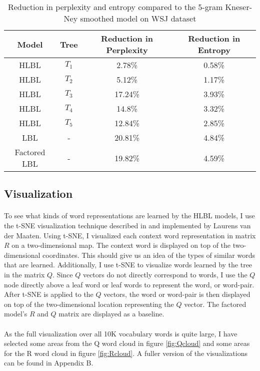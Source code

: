 \begin{table*} \centering
{}
\begin{tabular}{@{}cccc@{}}\toprule
Model & Tree & Reduction in Perplexity & Reduction in Entropy\\ 
\midrule
 HLBL & $T_1$ &2.78\% & 0.58\%\\
 HLBL & $T_2$ &5.12\% & 1.17\%\\
 HLBL & $T_3$ &17.24\% & 3.93\% \\
 HLBL & $T_4$ &14.8\% & 3.32\%\\
 HLBL & $T_5$ &12.84\% & 2.85\%\\
 LBL& - & 20.81\% &4.84\% \\
 Factored LBL & - &19.82\%&4.59\%\\
\bottomrule
\end{tabular}
\caption{Reduction in perplexity and entropy compared to the 5-gram Kneser-Ney smoothed model on WSJ dataset}
\label{tab:reductionPerplexity}
\end{table*}

\subsection{Visualization} \label{sec:tsne}
\paragraph{}
To see what kinds of word representations are learned by the HLBL models, I use the t-SNE visualization technique described in \cite{Maaten2008} and implemented by Laurens van der Maaten. Using t-SNE, I visualized each context word representation in matrix $R$ on a two-dimensional map. The context word is displayed on top of the two-dimensional coordinates. This should give us an idea of the types of similar words that are learned. Additionally, I use t-SNE to visualize words learned by the tree in the matrix $Q$. Since $Q$ vectors do not directly correspond to words, I use the $Q$ node directly above a leaf word or leaf words to represent the word, or word-pair. After t-SNE is applied to the $Q$ vectors, the word or word-pair is then displayed on top of the two-dimensional location representing the $Q$ vector. The factored model's $R$ and $Q$ matrix are displayed as a baseline.
\paragraph{}
As the full visualization over all 10K vocabulary words is quite large, I have selected some areas from the Q word cloud in figure \ref{fig:Qcloud} and some areas for the R word cloud in figure \ref{fig:Rcloud}. A fuller version of the visualizations can be found in Appendix B. 
